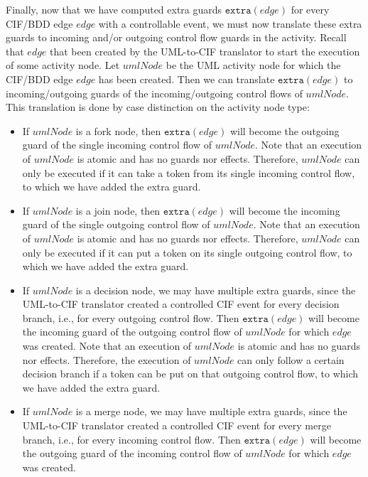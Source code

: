 \documentclass{article}
\theoremstyle{definition}
\begin{document}
Finally, now that we have computed extra guards $\texttt{extra}(\mathit{edge})$ for every CIF/BDD edge $\mathit{edge}$ with a controllable event, we must now translate these extra guards to incoming and/or outgoing control flow guards in the activity.
Recall that $\mathit{edge}$ that been created by the UML-to-CIF translator to start the execution of some activity node.
Let $\mathit{umlNode}$ be the UML activity node for which the CIF/BDD edge $\mathit{edge}$ has been created.
Then we can translate $\texttt{extra}(\mathit{edge})$ to incoming/outgoing guards of the incoming/outgoing control flows of $\mathit{umlNode}$.
This translation is done by case distinction on the activity node type:
\begin{itemize}
	\item If $\mathit{umlNode}$ is a fork node, then $\texttt{extra}(\mathit{edge})$ will become the outgoing guard of the single incoming control flow of $\mathit{umlNode}$.
	Note that an execution of $\mathit{umlNode}$ is atomic and has no guards nor effects.
	Therefore, $\mathit{umlNode}$ can only be executed if it can take a token from its single incoming control flow, to which we have added the extra guard.
	\item If $\mathit{umlNode}$ is a join node, then $\texttt{extra}(\mathit{edge})$ will become the incoming guard of the single outgoing control flow of $\mathit{umlNode}$.
	Note that an execution of $\mathit{umlNode}$ is atomic and has no guards nor effects.
	Therefore, $\mathit{umlNode}$ can only be executed if it can put a token on its single outgoing control flow, to which we have added the extra guard.
	\item If $\mathit{umlNode}$ is a decision node, we may have multiple extra guards, since the UML-to-CIF translator created a controlled CIF event for every decision branch, i.e., for every outgoing control flow.
	Then $\texttt{extra}(\mathit{edge})$ will become the incoming guard of the outgoing control flow of $\mathit{umlNode}$ for which $\mathit{edge}$ was created.
	Note that an execution of $\mathit{umlNode}$ is atomic and has no guards nor effects.
	Therefore, the execution of $\mathit{umlNode}$ can only follow a certain decision branch if a token can be put on that outgoing control flow, to which we have added the extra guard.
	\item If $\mathit{umlNode}$ is a merge node, we may have multiple extra guards, since the UML-to-CIF translator created a controlled CIF event for every merge branch, i.e., for every incoming control flow.
	Then $\texttt{extra}(\mathit{edge})$ will become the outgoing guard of the incoming control flow of $\mathit{umlNode}$ for which $\mathit{edge}$ was created.

\end{itemize}
\end{document}
